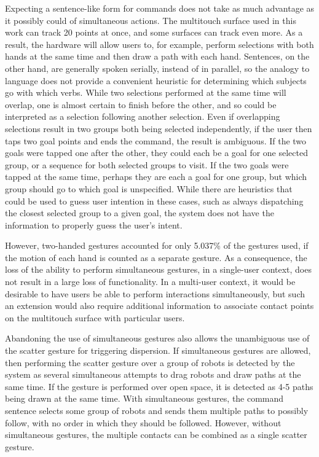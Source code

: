 Expecting a sentence-like form for commands does not take as much advantage as it possibly could of simultaneous actions. 
The multitouch surface used in this work can track 20 points at once, and some surfaces can track even more. 
As a result, the hardware will allow users to, for example, perform selections with both hands at the same time and then draw a path with each hand. 
Sentences, on the other hand, are generally spoken serially, instead of in parallel, so the analogy to language does not provide a convenient heuristic for determining which subjects go with which verbs.
While two selections performed at the same time will overlap, one is almost certain to finish before the other, and so could be interpreted as a selection following another selection. 
Even if overlapping selections result in two groups both being selected independently, if the user then taps two goal points and ends the command, the result is ambiguous. 
If the two goals were tapped one after the other, they could each be a goal for one selected group, or a sequence for both selected groups to visit.
If the two goals were tapped at the same time, perhaps they are each a goal for one group, but which group should go to which goal is unspecified.  
While there are heuristics that could be used to guess user intention in these cases, such as always dispatching the closest selected group to a given goal, the system does not have the information to properly guess the user's intent.

However, two-handed gestures accounted for only 5.037\% of the gestures used, if the motion of each hand is counted as a separate gesture. 
As a consequence, the loss of the ability to perform simultaneous gestures, in a single-user context, does not result in a large loss of functionality.
In a multi-user context, it would be desirable to have users be able to perform interactions simultaneously, but such an extension would also require additional information to associate contact points on the multitouch surface with particular users. 

Abandoning the use of simultaneous gestures also allows the unambiguous use of the scatter gesture for triggering dispersion. 
If simultaneous gestures are allowed, then performing the scatter gesture over a group of robots is detected by the system as several simultaneous attempts to drag robots and draw paths at the same time. 
If the gesture is performed over open space, it is detected as 4-5 paths being drawn at the same time. 
With simultaneous gestures, the command sentence selects some group of robots and sends them multiple paths to possibly follow, with no order in which they should be followed. 
However, without simultaneous gestures, the multiple contacts can be combined as a single scatter gesture. 

